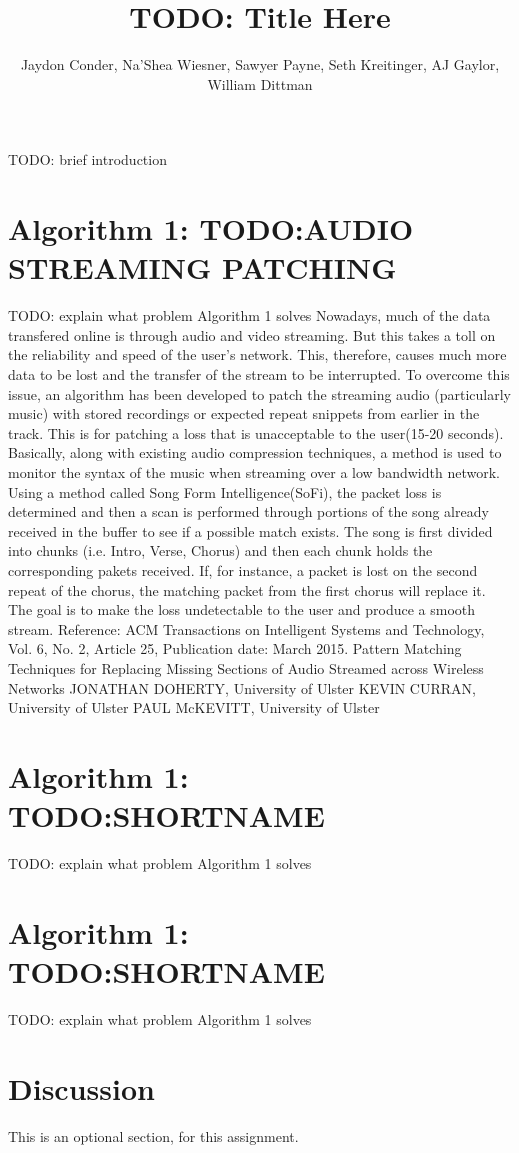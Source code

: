 \documentclass[11pt]{article}
\title{TODO: Title Here}
\author{Jaydon Conder, Na’Shea Wiesner, Sawyer Payne, Seth Kreitinger, AJ Gaylor, William Dittman}
\begin{document}
\maketitle

TODO: brief introduction

\section{Algorithm 1: TODO:AUDIO STREAMING PATCHING}
TODO: explain what problem Algorithm 1 solves
Nowadays, much of the data transfered online is through audio and video streaming.  But this takes a toll on the
reliability and speed of the user's network.  This, therefore, causes much more data to be lost and the transfer 
of the stream to be interrupted.  To overcome this issue, an algorithm has been developed to patch the streaming
audio (particularly music) with stored recordings or expected repeat snippets from earlier in the track.  This 
is for patching a loss that is unacceptable to the user(15-20 seconds).  Basically, along with existing audio compression 
techniques, a method is used to monitor the syntax of the music when streaming over a low bandwidth network.  
Using a method called Song Form Intelligence(SoFi), the packet loss is determined and then a scan is performed through portions of the song already received in the buffer to see if a possible match exists.  The song is first divided into chunks (i.e. 
Intro, Verse, Chorus)  and then each chunk holds the corresponding pakets received.  If, for instance, a packet is lost 
on the second repeat of the chorus, the matching packet from the first chorus will replace it.  The goal is to make
the loss undetectable to the user and produce a smooth stream.
Reference: ACM Transactions on Intelligent Systems and Technology, Vol. 6, No. 2, Article 25, Publication date: March 2015.
Pattern Matching Techniques for Replacing Missing Sections of
Audio Streamed across Wireless Networks
JONATHAN DOHERTY, University of Ulster
KEVIN CURRAN, University of Ulster
PAUL McKEVITT, University of Ulster

\section{Algorithm 1: TODO:SHORTNAME}
TODO: explain what problem Algorithm 1 solves

\section{Algorithm 1: TODO:SHORTNAME}
TODO: explain what problem Algorithm 1 solves

\section{Discussion}
This is an optional section, for this assignment.
\end{document}
